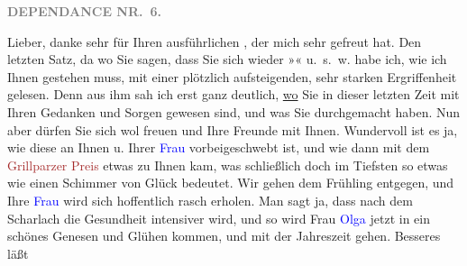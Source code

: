\pstart
           \textcolor{gray}{\textbf{DEPENDANCE NR. 6.}}\pend
           
\pstart{}Lieber,\pend
\pstart
           danke sehr für Ihren ausführlichen \label{K_L03491-1v}\label{K_L03491-1h}, der mich sehr gefreut hat. Den letzten Satz, da wo Sie sagen, dass Sie sich
               wieder »\label{K_L03491-2v}\label{K_L03491-2h}« u. s. w. habe ich, wie ich Ihnen gestehen muss, mit
               einer plötzlich aufsteigenden, sehr starken Ergriffenheit gelesen. Denn aus ihm sah
               ich erst ganz deutlich, \uline{wo} Sie in dieser letzten Zeit
               mit Ihren Gedanken und Sorgen gewesen sind, und was Sie durchgemacht haben. Nun aber
               dürfen Sie sich wol freuen und Ihre Freunde mit Ihnen. Wundervoll ist es ja, wie
               diese \label{K_L03491-3v}\label{K_L03491-3h} an Ihnen u. Ihrer \textcolor{blue}{Frau}{}\ledrightnote{{$\rightarrow$}\textcolor{blue}{Olga Schnitzler}} vorbeigeschwebt ist, und wie dann mit dem \textcolor{brown}{Grillparzer Preis}{}\ledrightnote{\textcolor{brown}{Franz-Grillparzer-Preis}} etwas zu Ihnen kam, was schließlich doch im
               Tiefsten so etwas wie einen Schimmer von Glück bedeutet. Wir gehen dem Frühling
               entgegen, und Ihre \textcolor{blue}{Frau}{}\ledrightnote{{$\rightarrow$}\textcolor{blue}{Olga Schnitzler}} wird
               sich hoffentlich rasch erholen. Man sagt ja, dass nach dem Scharlach die Gesundheit
               intensiver wird, und so wird Frau \textcolor{blue}{Olga}{}\ledrightnote{\textcolor{blue}{Olga Schnitzler}} jetzt in
               ein schönes Genesen und Glühen kommen, und mit der Jahreszeit gehen. Besseres läßt
